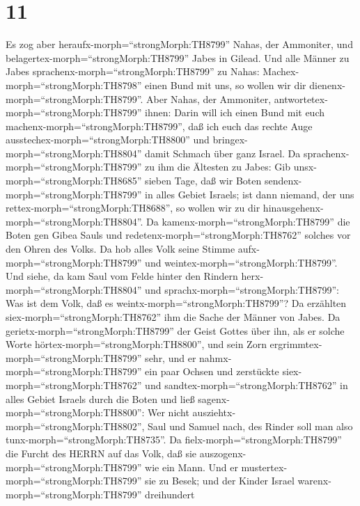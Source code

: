 \hypertarget{section-10}{%
\section{11}\label{section-10}}

 Es zog aber heraufx-morph=``strongMorph:TH8799'' Nahas, der
Ammoniter, und belagertex-morph=``strongMorph:TH8799'' Jabes in Gilead.
Und alle Männer zu Jabes sprachenx-morph=``strongMorph:TH8799'' zu
Nahas: Machex-morph=``strongMorph:TH8798'' einen Bund mit uns, so wollen
wir dir dienenx-morph=``strongMorph:TH8799''.  Aber Nahas,
der Ammoniter, antwortetex-morph=``strongMorph:TH8799'' ihnen: Darin
will ich einen Bund mit euch machenx-morph=``strongMorph:TH8799'', daß
ich euch das rechte Auge ausstechex-morph=``strongMorph:TH8800'' und
bringex-morph=``strongMorph:TH8804'' damit Schmach über ganz Israel.
 Da sprachenx-morph=``strongMorph:TH8799'' zu ihm die
Ältesten zu Jabes: Gib unsx-morph=``strongMorph:TH8685'' sieben Tage,
daß wir Boten sendenx-morph=``strongMorph:TH8799'' in alles Gebiet
Israels; ist dann niemand, der uns rettex-morph=``strongMorph:TH8688'',
so wollen wir zu dir hinausgehenx-morph=``strongMorph:TH8804''.
 Da kamenx-morph=``strongMorph:TH8799'' die Boten gen Gibea
Sauls und redetenx-morph=``strongMorph:TH8762'' solches vor den Ohren
des Volks. Da hob alles Volk seine Stimme
aufx-morph=``strongMorph:TH8799'' und
weintex-morph=``strongMorph:TH8799''.  Und siehe, da kam
Saul vom Felde hinter den Rindern herx-morph=``strongMorph:TH8804'' und
sprachx-morph=``strongMorph:TH8799'': Was ist dem Volk, daß es
weintx-morph=``strongMorph:TH8799''? Da erzählten
siex-morph=``strongMorph:TH8762'' ihm die Sache der Männer von Jabes.
 Da gerietx-morph=``strongMorph:TH8799'' der Geist Gottes
über ihn, als er solche Worte hörtex-morph=``strongMorph:TH8800'', und
sein Zorn ergrimmtex-morph=``strongMorph:TH8799'' sehr,  und
er nahmx-morph=``strongMorph:TH8799'' ein paar Ochsen und zerstückte
siex-morph=``strongMorph:TH8762'' und
sandtex-morph=``strongMorph:TH8762'' in alles Gebiet Israels durch die
Boten und ließ sagenx-morph=``strongMorph:TH8800'': Wer nicht
ausziehtx-morph=``strongMorph:TH8802'', Saul und Samuel nach, des Rinder
soll man also tunx-morph=``strongMorph:TH8735''. Da
fielx-morph=``strongMorph:TH8799'' die Furcht des HERRN auf das Volk,
daß sie auszogenx-morph=``strongMorph:TH8799'' wie ein Mann.
 Und er mustertex-morph=``strongMorph:TH8799'' sie zu Besek;
und der Kinder Israel warenx-morph=``strongMorph:TH8799'' dreihundert
